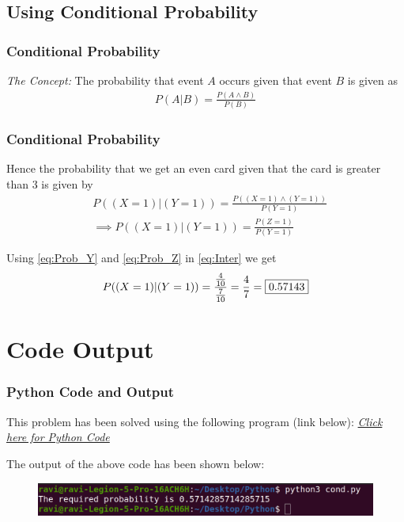 \documentclass{beamer}
\begin{document}
\subsection{Using Conditional Probability}
\begin{frame}
  \frametitle{Conditional Probability}
  \emph{The Concept:}
  The probability that event $A$ occurs given that event $B$ is given as
  \begin{align}
    P(A|B) = \frac{P(A\wedge{}B)}{P(B)}
    \label{eq:Master}
  \end{align}
\end{frame}

\begin{frame}
  \frametitle{Conditional Probability}
  Hence the probability that we get an even card given that the card is greater than 3 is given by
  \begin{align}
    &P((X = 1)|(Y = 1)) = \frac{P((X = 1)\wedge{}(Y = 1))}{P(Y = 1)}
    \\
    &\implies P((X = 1)|(Y = 1)) = \frac{P(Z = 1)}{P(Y = 1)}
    \label{eq:Inter}
  \end{align}

  Using
  \eqref{eq:Prob_Y}
  and
  \eqref{eq:Prob_Z}
  in
  \eqref{eq:Inter}
  we get
  \begin{align}
    P((X = 1)|(Y = 1)) = \frac{\frac{4}{10}}{\frac{7}{10}} = \frac{4}{7} = \fbox{0.57143}
  \end{align}
\end{frame}

\section{Code Output}

\begin{frame}
  \frametitle{Python Code and Output}
  This problem has been solved using the following program (link below):
  \href{https://github.com/purplehand52/AI1110_Assignments/blob/main/Assignment5/PyCode/cond.py}{\emph{Click here for Python Code}}

  The output of the above code has been shown below:
  \begin{figure}[!ht]
    \centering
    \includegraphics[width=\columnwidth]{../Figures/cond.png}
  \end{figure}
\end{frame}
\end{document}
